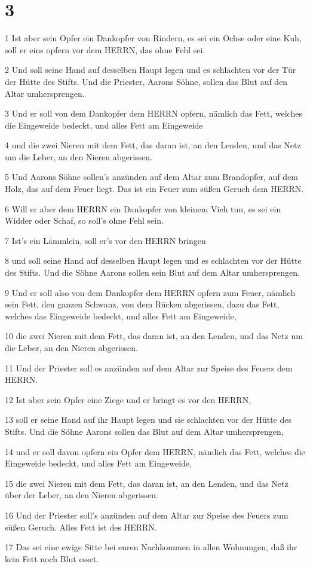 \chapter{3}

\par 1 Ist aber sein Opfer ein Dankopfer von Rindern, es sei ein Ochse oder eine Kuh, soll er eins opfern vor dem HERRN, das ohne Fehl sei.
\par 2 Und soll seine Hand auf desselben Haupt legen und es schlachten vor der Tür der Hütte des Stifts. Und die Priester, Aarons Söhne, sollen das Blut auf den Altar umhersprengen.
\par 3 Und er soll von dem Dankopfer dem HERRN opfern, nämlich das Fett, welches die Eingeweide bedeckt, und alles Fett am Eingeweide
\par 4 und die zwei Nieren mit dem Fett, das daran ist, an den Lenden, und das Netz um die Leber, an den Nieren abgerissen.
\par 5 Und Aarons Söhne sollen's anzünden auf dem Altar zum Brandopfer, auf dem Holz, das auf dem Feuer liegt. Das ist ein Feuer zum süßen Geruch dem HERRN.
\par 6 Will er aber dem HERRN ein Dankopfer von kleinem Vieh tun, es sei ein Widder oder Schaf, so soll's ohne Fehl sein.
\par 7 Ist's ein Lämmlein, soll er's vor den HERRN bringen
\par 8 und soll seine Hand auf desselben Haupt legen und es schlachten vor der Hütte des Stifts. Und die Söhne Aarons sollen sein Blut auf dem Altar umhersprengen.
\par 9 Und er soll also von dem Dankopfer dem HERRN opfern zum Feuer, nämlich sein Fett, den ganzen Schwanz, von dem Rücken abgerissen, dazu das Fett, welches das Eingeweide bedeckt, und alles Fett am Eingeweide,
\par 10 die zwei Nieren mit dem Fett, das daran ist, an den Lenden, und das Netz um die Leber, an den Nieren abgerissen.
\par 11 Und der Priester soll es anzünden auf dem Altar zur Speise des Feuers dem HERRN.
\par 12 Ist aber sein Opfer eine Ziege und er bringt es vor den HERRN,
\par 13 soll er seine Hand auf ihr Haupt legen und sie schlachten vor der Hütte des Stifts. Und die Söhne Aarons sollen das Blut auf dem Altar umhersprengen,
\par 14 und er soll davon opfern ein Opfer dem HERRN, nämlich das Fett, welches die Eingeweide bedeckt, und alles Fett am Eingeweide,
\par 15 die zwei Nieren mit dem Fett, das daran ist, an den Lenden, und das Netz über der Leber, an den Nieren abgerissen.
\par 16 Und der Priester soll's anzünden auf dem Altar zur Speise des Feuers zum süßen Geruch. Alles Fett ist des HERRN.
\par 17 Das sei eine ewige Sitte bei euren Nachkommen in allen Wohnungen, daß ihr kein Fett noch Blut esset.

